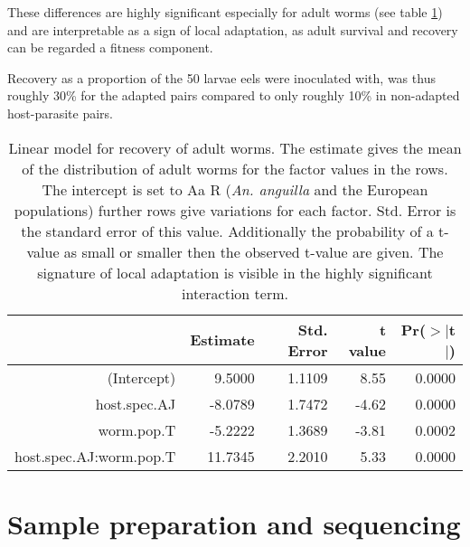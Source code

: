 These differences are highly significant especially for adult worms
(see table \ref{tab:ad-sig}) and are interpretable as a sign of local
adaptation, as adult survival and recovery can be regarded a fitness
component.

Recovery as a proportion of the 50 larvae eels were inoculated with,
was thus roughly 30\% for the adapted pairs compared to only roughly
10\% in non-adapted host-parasite pairs.

\afterpage{\clearpage}

\begin{table}[h]
\begin{center}
\begin{tabular}{rrrrr}
  \hline
 & Estimate & Std. Error & t value & Pr($>$$|$t$|$) \\ 
  \hline
  (Intercept) & 9.5000 & 1.1109 & 8.55 & 0.0000 \\ 
  host.spec.AJ & -8.0789 & 1.7472 & -4.62 & 0.0000 \\ 
  worm.pop.T & -5.2222 & 1.3689 & -3.81 & 0.0002 \\ 
  host.spec.AJ:worm.pop.T & 11.7345 & 2.2010 & 5.33 & 0.0000 \\ 
   \hline
\end{tabular}
\caption[Linear model for recovery]{Linear model for recovery of adult
  worms. The estimate gives the mean of the distribution of adult
  worms for the factor values in the rows. The intercept is set to Aa
  R (\textit{An. anguilla} and the European populations) further rows
  give variations for each factor. Std. Error is the standard error of
  this value. Additionally the probability of a t-value as small or
  smaller then the observed t-value are given. The signature of
  local adaptation is visible in the highly significant interaction
  term.}
\label{tab:ad-sig}
\end{center}
\end{table}




\section{Sample preparation and sequencing }


